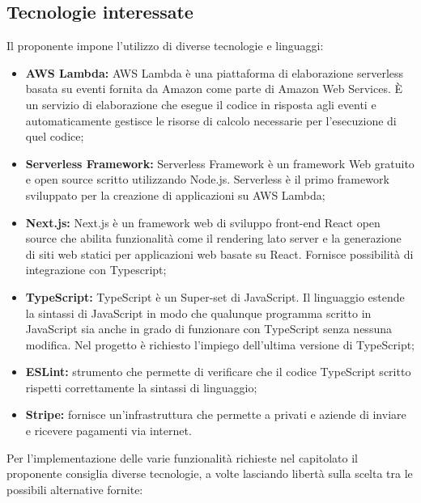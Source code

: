 \subsection{Tecnologie interessate}
Il proponente impone l’utilizzo di diverse tecnologie e linguaggi:
\begin{itemize}
    \item \textbf{AWS Lambda:} AWS Lambda è una piattaforma di elaborazione serverless basata su eventi fornita da Amazon come parte di Amazon Web Services. È un servizio di elaborazione che esegue il codice in risposta agli eventi e automaticamente gestisce le risorse di calcolo necessarie per l'esecuzione di quel codice;
    \item \textbf{Serverless Framework:} Serverless Framework è un framework Web gratuito e open source scritto utilizzando Node.js. Serverless è il primo framework sviluppato per la creazione di applicazioni su AWS Lambda;
    \item \textbf{Next.js:} Next.js è un framework web di sviluppo front-end React open source che abilita funzionalità come il rendering lato server e la generazione di siti web statici per applicazioni web basate su React. Fornisce possibilità di integrazione con Typescript;
    \item \textbf{TypeScript:} TypeScript è un Super-set di JavaScript. Il linguaggio estende la sintassi di JavaScript in modo che qualunque programma scritto in JavaScript sia anche in grado di funzionare con TypeScript senza nessuna modifica. Nel progetto è richiesto l'impiego dell'ultima versione di TypeScript;
    \item \textbf{ESLint:} strumento che permette di verificare che il codice TypeScript scritto rispetti correttamente la sintassi di linguaggio;
    \item \textbf{Stripe:} fornisce un’infrastruttura che permette a privati e aziende di inviare e ricevere pagamenti via internet.
\end{itemize}
Per l'implementazione delle varie funzionalità richieste nel capitolato il proponente consiglia diverse tecnologie, a volte lasciando libertà sulla scelta tra le possibili alternative fornite:
